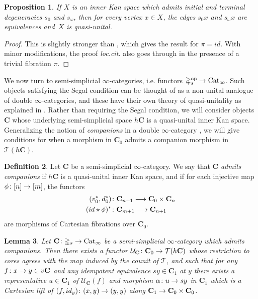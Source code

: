 \documentclass[10pt]{amsart}
\numberwithin{equation}{section}
\newtheorem{prop}{Proposition}[subsection]
\newtheorem{lem}[prop]{Lemma}
\theoremstyle{definition}
\newtheorem{definition}[prop]{Definition}
\DeclareMathOperator{\op}{op}
\newcommand{\Cat}{\mathrm{Cat}\vphantom{t}}
\newcommand{\Simp}{\mathbb{\Delta}}
\newcommand{\cT}{\mathcal{T}}
\newcommand{\cU}{\mathcal{U}}
\newcommand{\bfC}{\mathbf{C}}
\newcommand{\join}{\star}
\renewcommand{\to}{\mathchoice{\longrightarrow}{\rightarrow}{}{}}
\begin{document}
	\begin{prop}\label{prop:outer_degeneracies}
		If $X$ is an inner Kan space which admits initial and terminal degeneracies $s_0$ and $s_{\omega}$, then for every vertex $x\in X$, the edges $s_0x$ and  $s_{\omega} x$ are equivalences and~$X$ is quasi-unital.
	\end{prop}

	\begin{proof}
		This is slightly stronger than \cite*[Theorem 1.2]{oldervoll2026quasi}, which gives the result for $\pi=id$. With minor modifications, the proof \emph{loc.cit.} also goes through in the presence of a trivial fibration $\pi$.
	\end{proof}

	We now turn to semi-simplicial $\infty$-categories, i.e. functors $\Simp^{\op}_{s} \to \Cat_{\infty}$. Such objects satisfying the Segal condition can be thought of as a non-unital analogue of double $\infty$-categories, and these have their own theory of quasi-unitality as explained in \cite{haugseng2021segal}.
  Rather than requiring the Segal condition, we will consider objects $\bfC$ whose underlying semi-simplicial space $h\bfC$ is a quasi-unital inner Kan space. Generalizing the notion of \emph{companions} in a double $\infty$-category \cite*[Definition 4.1]{ruit2025companion}, we will give conditions for when a morphism in $\bfC_{0}$ admits a companion morphism in $\cT(h\bfC)$.


	\begin{definition}\label{def:admits_companions}
		Let $\bfC$ be a semi-simplicial $\infty$-category. We say that $\bfC$ \emph{admits companions} if $h\bfC$ is a quasi-unital inner Kan space, and if for each injective map $\phi \colon [n]\to [m]$, the functors
		\begin{align*}
			(v_{0}^{*}, d_{0}^{*}) &\colon \bfC_{n+1} \to \bfC_{0} \times \bfC_{n} \\
			(id\join \phi)^{*}&\colon \bfC_{m+1} \to \bfC_{n+1}
		\end{align*}
		are morphisms of Cartesian fibrations over $\bfC_{0}$.
	\end{definition}
	\begin{lem}\label{lem:companion_functor}
		Let $\bfC\colon \Simp_{s} \to \Cat_{\infty}$ be a semi-simplicial $\infty$-category which admits companions.
    Then there exists a functor $\cU_{\bfC}\colon \bfC_{0} \to \cT(h\bfC) $ whose restriction to cores agrees with the map induced by the counit of $\cT$, and such that for any $f\colon x \to y \in v\bfC$ and any idempotent equivalence $sy\in \bfC_{1}$ at $y$ there exists a representative $u\in \bfC_{1}$ of $\cU_{\bfC}(f)$ and morphism $\alpha \colon u \to sy$ in $\bfC_{1}$ which is a Cartesian lift of $(f,id_{y})\colon (x,y) \to (y,y)$ along $\bfC_{1}\to \bfC_{0}\times \bfC_{0}$.
	\end{lem}
\end{document}
